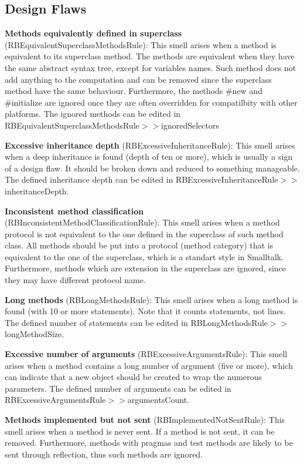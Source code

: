 \subsection{Design Flaws}
\textbf{Methods equivalently defined in superclass} (RBEquivalentSuperclassMethodsRule): This smell arises when a method is equivalent to its superclass method. The methods are equivalent when they have the same abstract syntax tree, except for variables names. Such method does not add anything to the computation and can be removed since the superclass method have the same behaviour. Furthermore, the methods \#new and \#initialize are ignored once they are often overridden for compatilbity with other platforms. The ignored methods can be edited in RBEquivalentSuperclassMethodsRule$>>$ignoredSelectors

\textbf{Excessive inheritance depth} (RBExcessiveInheritanceRule): This smell arises when a deep inheritance is found (depth of ten or more), which is usually a sign of a design flaw. It should be broken down and reduced to something manageable. The defined inheritance depth can be edited in RBExcessiveInheritanceRule$>>$inheritanceDepth.

\textbf{Inconsistent method classification} (RBInconsistentMethodClassificationRule): This smell arises when a method protocol is not equivalent to the one defined in the superclass of such method class. All methods should be put into a protocol (method category) that is equivalent to the one of the superclass, which is a standart style in Smalltalk. Furthermore, methods which are extension in the superclass are ignored, since they may have different protocol name.

\textbf{Long methods} (RBLongMethodsRule): This smell arises when a long method is found (with 10 or more statements). Note that it counts statements, not lines. The defined number of statements can be edited in RBLongMethodsRule$>>$longMethodSize.

\textbf{Excessive number of arguments} (RBExcessiveArgumentsRule): This smell arises when a method contains a long number of argument (five or more), which can indicate that a new object should be created to wrap the numerous parameters. The defined number of arguments can be edited in RBExcessiveArgumentsRule$>>$argumentsCount.

\textbf{Methods implemented but not sent} (RBImplementedNotSentRule): This smell arises when a method is never sent. If a method is not sent, it can be removed. Furthermore, methods with pragmas and test methods are likely to be sent through reflection, thus such methods are ignored.

